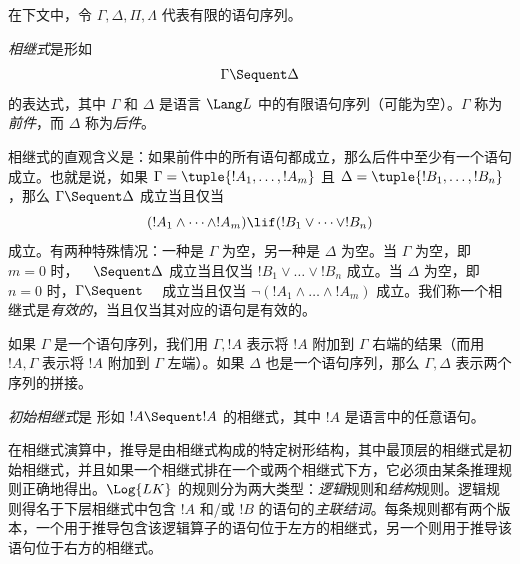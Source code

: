 \documentclass[../../../include/open-logic-section]{subfiles}
\begin{document}
      {}
      {}


在下文中，令 $\Gamma, \Delta, \Pi, \Lambda$ 代表有限的语句序列。

\begin{defn}[相继式]
\emph{相继式}是形如
\[
\Gamma \Sequent \Delta
\]
的表达式，其中 $\Gamma$ 和 $\Delta$ 是语言 $\Lang L$ 中的有限语句序列（可能为空）。$\Gamma$ 称为\emph{前件}，而 $\Delta$ 称为\emph{后件}。
\end{defn}

\begin{explain}
相继式的直观含义是：如果前件中的所有语句都成立，那么后件中至少有一个语句成立。也就是说，如果 $\Gamma = \tuple{!A_1, \dots, !A_m}$ 且
$\Delta = \tuple{!B_1, \dots, !B_n}$，那么 $\Gamma \Sequent \Delta$ 成立当且仅当
\[
(!A_1 \land \cdots \land !A_m) \lif (!B_1 \lor \cdots \lor
!B_n)
\]
成立。有两种特殊情况：一种是 $\Gamma$ 为空，另一种是 $\Delta$ 为空。当 $\Gamma$ 为空，即 $m = 0$ 时，$\quad \Sequent \Delta$ 成立当且仅当 $!B_1 \lor \dots \lor !B_n$ 成立。当 $\Delta$ 为空，即 $n = 0$ 时，$\Gamma \Sequent \quad$ 成立当且仅当 $\lnot(!A_1 \land \dots \land !A_m)$ 成立。我们称一个相继式是\emph{有效的}，当且仅当其对应的语句是有效的。
\end{explain}

如果 $\Gamma$ 是一个语句序列，我们用 $\Gamma, !A$ 表示将 $!A$ 附加到 $\Gamma$ 右端的结果（而用 $!A, \Gamma$ 表示将 $!A$ 附加到 $\Gamma$ 左端）。如果 $\Delta$ 也是一个语句序列，那么 $\Gamma, \Delta$ 表示两个序列的拼接。

\begin{defn}[初始相继式]
\emph{初始相继式}是
{形如 $!A \Sequent !A$ 的相继式}，其中 $!A$ 是语言中的任意语句。
\end{defn}

在相继式演算中，推导是由相继式构成的特定树形结构，其中最顶层的相继式是初始相继式，并且如果一个相继式排在一个或两个相继式下方，它必须由某条推理规则正确地得出。$\Log{LK}$ 的规则分为两大类型：\emph{逻辑}规则和\emph{结构}规则。逻辑规则得名于下层相继式中包含 $!A$ 和/或 $!B$ 的语句的\emph{主联结词}。每条规则都有两个版本，一个用于推导包含该逻辑算子的语句位于左方的相继式，另一个则用于推导该语句位于右方的相继式。
\end{document}
